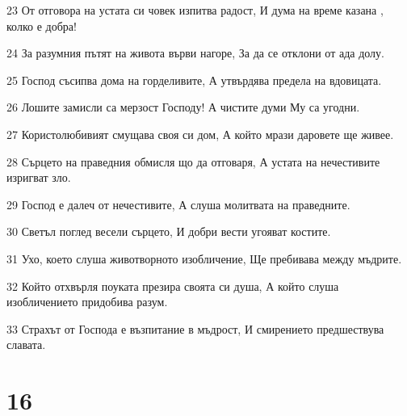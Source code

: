 \par 23 От отговора на устата си човек изпитва радост, И дума на време казана , колко е добра!
\par 24 За разумния пътят на живота върви нагоре, За да се отклони от ада долу.
\par 25 Господ съсипва дома на горделивите, А утвърдява предела на вдовицата.
\par 26 Лошите замисли са мерзост Господу! А чистите думи Му са угодни.
\par 27 Користолюбивият смущава своя си дом, А който мрази даровете ще живее.
\par 28 Сърцето на праведния обмисля що да отговаря, А устата на нечестивите изригват зло.
\par 29 Господ е далеч от нечестивите, А слуша молитвата на праведните.
\par 30 Светъл поглед весели сърцето, И добри вести угояват костите.
\par 31 Ухо, което слуша животворното изобличение, Ще пребивава между мъдрите.
\par 32 Който отхвърля поуката презира своята си душа, А който слуша изобличението придобива разум.
\par 33 Страхът от Господа е възпитание в мъдрост, И смирението предшествува славата.

\chapter{16}


